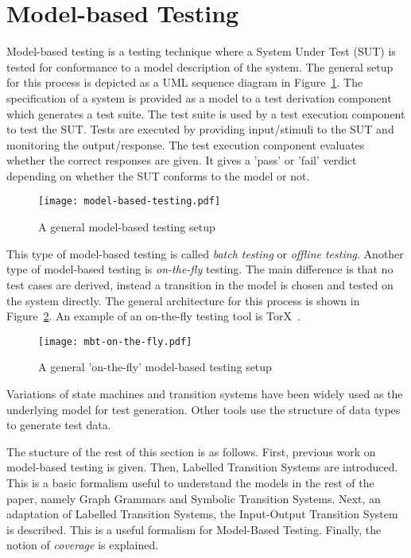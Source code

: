 \section{Model-based Testing}\label{sec:model_based_testing}

Model-based testing is a testing technique where a System Under Test (SUT) is tested for conformance to a model description of the system. The general setup for this process is depicted as a UML sequence diagram in Figure~\ref{fig:model_based_testing}. The specification of a system is provided as a model to a test derivation component which generates a test suite. The test suite is used by a test execution component to test the SUT. Tests are executed by providing input/stimuli to the SUT and monitoring the output/response. The test execution component evaluates whether the correct responses are given. It gives a 'pass' or 'fail' verdict depending on whether the SUT conforms to the model or not.

\begin{figure}[ht]
  \begin{center}
    \texttt{[image: model-based-testing.pdf]}
  \end{center}
  \caption{A general model-based testing setup}
  \label{fig:model_based_testing}
\end{figure}

This type of model-based testing is called \textit{batch testing} or \textit{offline testing}. Another type of model-based testing is \textit{on-the-fly} testing. The main difference is that no test cases are derived, instead a transition in the model is chosen and tested on the system directly. The general architecture for this process is shown in Figure~\ref{fig:model_based_testing_on_the_fly}. An example of an on-the-fly testing tool is TorX~\cite{Tretmans:TorX}.

\begin{figure}[ht]
  \begin{center}
    \texttt{[image: mbt-on-the-fly.pdf]}
  \end{center}
  \caption{A general 'on-the-fly' model-based testing setup}
  \label{fig:model_based_testing_on_the_fly}
\end{figure}

Variations of state machines and transition systems have been widely used as the underlying model for test generation. Other tools use the structure of data types to generate test data. 

The stucture of the rest of this section is as follows. First, previous work on model-based testing is given. Then, Labelled Transition Systems are introduced. This is a basic formalism useful to understand the models in the rest of the paper, namely Graph Grammars and Symbolic Transition Systems. Next, an adaptation of Labelled Transition Systems, the Input-Output Transition System is described. This is a useful formalism for Model-Based Testing. Finally, the notion of \textit{coverage} is explained.

